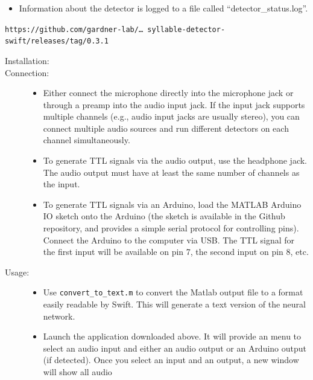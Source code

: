 \documentclass[10pt,letterpaper]{article}
\begin{document}
\begin{description}
\begin{description}
\begin{description}
\begin{itemize}
      {\tt buffer\_size\_output} parameters.
      \item Information about the detector is logged to a file called ``detector\_status.log''.
      \end{itemize}
    \end{description}
  \item[Swift:] {\tt https://github.com/gardner-lab/\dots\ syllable-detector-swift/releases/tag/0.3.1}
    \begin{description}
    \item[Installation:]\hfill
    \item[Connection:]\hfill
      \begin{itemize}
      \item Either connect the microphone directly into the microphone jack or through a 
      preamp into the audio input jack. If the input jack supports multiple channels (e.g., 
      audio input jacks are usually stereo), you can connect multiple audio sources and run 
      different detectors on each channel simultaneously.
      \item To generate TTL signals via the audio output, use the headphone jack. The 
      audio output must have at least the same number of channels as the input.
      \item To generate TTL signals via an Arduino, load the MATLAB Arduino IO sketch 
      onto the Arduino (the sketch is available in the Github repository, and provides a 
      simple serial protocol for controlling pins). Connect the Arduino 
      to the computer via USB. The TTL signal for the first input will be available on 
      pin 7, the second input on pin 8, etc.
      \end{itemize}
    \item[Usage:]\hfill
      \begin{itemize}
      \item Use {\tt convert\_to\_text.m} to convert the Matlab output file to a format 
      easily readable by Swift. This will generate a text version of the neural network.
      \item Launch the application downloaded above. It will provide an 
      menu to select an audio input and either an audio output or an Arduino output (if 
      detected). Once you select an input and an output, a new window will show all audio 

\end{itemize}
\end{description}
\end{description}
\end{description}
\end{document}
